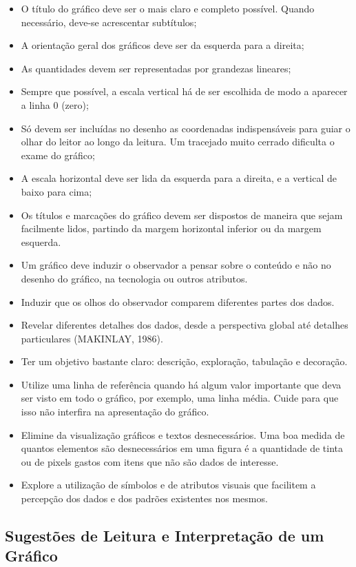\begin{itemize}
\item O título do gráfico deve ser o mais claro e completo possível. Quando necessário, deve-se acrescentar subtítulos;
\item A orientação geral dos gráficos deve ser da esquerda para a direita;
\item As quantidades devem ser representadas por grandezas lineares;
\item Sempre que possível, a escala vertical há de ser escolhida de modo a aparecer a linha 0 (zero);
\item Só devem ser incluídas no desenho as coordenadas indispensáveis para guiar o olhar do leitor ao longo da leitura. Um tracejado muito cerrado dificulta o exame do gráfico;
\item A escala horizontal deve ser lida da esquerda para a direita, e a vertical de baixo para cima;
\item Os títulos e marcações do gráfico devem ser dispostos de maneira que sejam facilmente lidos, partindo da margem horizontal inferior ou da margem esquerda.
\item Um gráfico deve induzir o observador a pensar sobre o conteúdo e não no desenho do gráfico, na tecnologia ou outros atributos.
\item Induzir que os olhos do observador comparem diferentes partes dos dados.
\item Revelar diferentes detalhes dos dados, desde a perspectiva global até detalhes particulares (MAKINLAY, 1986).
\item Ter um objetivo bastante claro: descrição, exploração, tabulação e decoração.
\item Utilize uma linha de referência quando há algum valor importante que deva ser visto em todo o gráfico, por exemplo, uma linha média. Cuide para que isso não interfira na apresentação do gráfico.
\item Elimine da visualização gráficos e textos desnecessários. Uma boa medida de
quantos elementos são desnecessários em uma figura é a quantidade de tinta ou de
pixels gastos com itens que não são dados de interesse.
\item Explore a utilização de símbolos e de atributos visuais que facilitem a percepção
dos dados e dos padrões existentes nos mesmos.
\end{itemize}

\newpage
\subsection{Sugestões de Leitura e Interpretação de um Gráfico}

